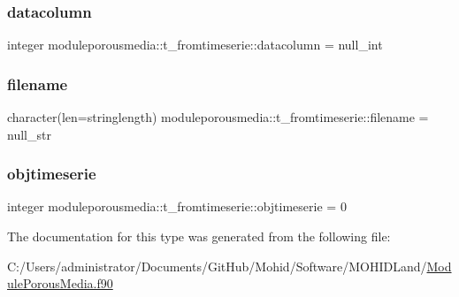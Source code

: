 \subsubsection{\texorpdfstring{datacolumn}{datacolumn}}
{\footnotesize\ttfamily integer moduleporousmedia\+::t\+\_\+fromtimeserie\+::datacolumn = null\+\_\+int\hspace{0.3cm}{\ttfamily [private]}}

\mbox{\label{structmoduleporousmedia_1_1t__fromtimeserie_a3627876b473fe4953ddbb656d275e828}} 
\subsubsection{\texorpdfstring{filename}{filename}}
{\footnotesize\ttfamily character(len=stringlength) moduleporousmedia\+::t\+\_\+fromtimeserie\+::filename = null\+\_\+str\hspace{0.3cm}{\ttfamily [private]}}

\mbox{\label{structmoduleporousmedia_1_1t__fromtimeserie_a1f61da628f36433b2e7abf95817fbde7}} 
\subsubsection{\texorpdfstring{objtimeserie}{objtimeserie}}
{\footnotesize\ttfamily integer moduleporousmedia\+::t\+\_\+fromtimeserie\+::objtimeserie = 0\hspace{0.3cm}{\ttfamily [private]}}



The documentation for this type was generated from the following file\+:\begin{DoxyCompactItemize}
\item 
C\+:/\+Users/administrator/\+Documents/\+Git\+Hub/\+Mohid/\+Software/\+M\+O\+H\+I\+D\+Land/\mbox{\hyperlink{_module_porous_media_8f90}{Module\+Porous\+Media.\+f90}}\end{DoxyCompactItemize}
